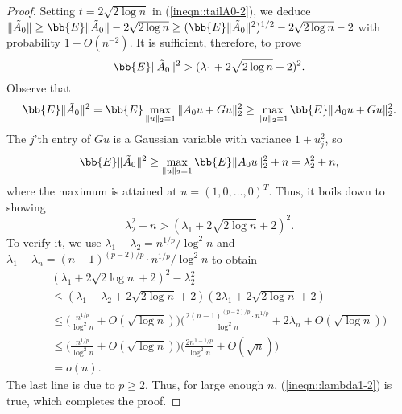 \documentclass[12pt]{article}%
\theoremstyle{plain}%
\theoremstyle{remark}
\begin{document}
\begin{proof}
Setting $t = 2\sqrt{2 \log n}$ in (\ref{ineqn::tailA0-2}), we deduce $\| \tilde{A}_0 \| \ge \bb{E} \| \tilde{A}_0 \|-  2\sqrt{2\log n} \ge (\bb{E} \| \tilde{A}_0 \|^2)^{1/2} - 2\sqrt{2\log n} - 2$ with probability $1 - O(n^{-2})$. It is sufficient, therefore, to prove
\begin{equation*}
\bb{E} \| \tilde{A}_0 \|^2 > (\lambda_1 + 2\sqrt{2 \log n} + 2 )^2.
\end{equation*}
Observe that 
\begin{equation*}
\bb{E} \| \tilde{A}_0 \|^2 = \bb{E} \max_{\| u \|_2 = 1} \| A_0u + Gu \|_2^2 \ge \max_{\| u \|_2 = 1} \bb{E} \| A_0u + Gu \|_2^2.
\end{equation*}
The $j$'th entry of $Gu$ is a Gaussian variable with variance $1 + u_j^2$, so
\begin{equation}\label{ineqn::lambda1-2}
\bb{E} \| \tilde{A}_0 \|^2 \ge \max_{\| u \|_2 = 1} \bb{E} \| A_0u \|_2^2 + n = \lambda_2^2 +n,
\end{equation}
where the maximum is attained at $u = (1,0,\ldots,0)^T$. Thus, it boils down to showing 
\begin{equation*}
\lambda_2^2 +n > (\lambda_1 + 2\sqrt{2 \log n} + 2 )^2.
\end{equation*}
To verify it, we use $\lambda_1 - \lambda_2 = n^{1/p}/\log^2 n$ and $\lambda_1 - \lambda_n = (n-1)^{(p-2)/p} \cdot n^{1/p}/\log^2 n$ to obtain
\begin{align*}
~~~~ &(\lambda_1 + 2\sqrt{2 \log n} + 2 )^2 - \lambda_2^2 \\
&\le (\lambda_1 - \lambda_2 + 2\sqrt{2\log n} + 2) (2\lambda_1 + 2\sqrt{2\log n} + 2) \\
&\le \Big(\frac{n^{1/p}}{\log^2 n} + O(\sqrt{\log n})\Big) \Big( \frac{2(n-1)^{(p-2)/p} \cdot n^{1/p}}{\log^2 n} + 2\lambda_n + O(\sqrt{\log n}) \Big)\\
&\le \Big(\frac{n^{1/p}}{\log^2 n} + O(\sqrt{\log n})\Big) \Big( \frac{2n^{1 - 1/p}}{\log^2 n} + O(\sqrt{ n}) \Big)\\
&= o(n).
\end{align*}
The last line is due to $p \ge 2$. Thus, for large enough $n$, (\ref{ineqn::lambda1-2}) is true, which completes the proof.

\end{proof}
\end{document}

